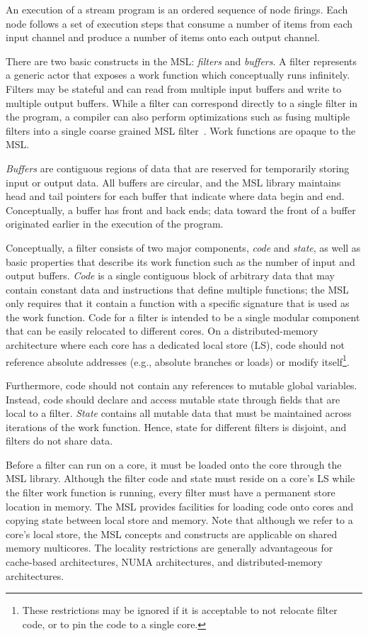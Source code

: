 An execution of a stream program is an ordered sequence of node
firings. Each node follows a set of execution steps that consume a
number of items from each input channel and produce a number of items
onto each output channel.

There are two basic constructs in the MSL: \emph{filters} and
\emph{buffers}. A filter represents a generic actor that exposes a
work function which conceptually runs infinitely. Filters may be
stateful and can read from multiple input buffers and write to multiple
output buffers. While a filter can correspond directly to a
single filter in the program, a compiler can also perform
optimizations such as fusing multiple filters into a single
coarse grained MSL filter~\cite{asplos02}. Work functions are opaque to the MSL.

\emph{Buffers} are contiguous regions of data that are reserved for
temporarily storing input or output data. All buffers are circular,
and the MSL library maintains head and tail pointers for each buffer
that indicate where data begin and end. Conceptually, a buffer has
front and back ends; data toward the front of a buffer originated
earlier in the execution of the program.

Conceptually, a filter consists of two major components, \emph{code}
and \emph{state}, as well as basic properties that describe its work
function such as the number of input and output buffers. \emph{Code}
is a single contiguous block of arbitrary data that may contain
constant data and instructions that define multiple functions; the MSL
only requires that it contain a function with a specific signature
that is used as the work function. Code for a filter is intended to be
a single modular component that can be easily relocated to different
cores. On a distributed-memory architecture where each core has a
dedicated local store (LS), code should not reference absolute
addresses (e.g., absolute branches or loads) or modify
itself\footnote{These restrictions may be ignored if it is acceptable
to not relocate filter code, or to pin the code to a single core.}.

Furthermore, code should not contain any references to mutable global
variables. Instead, code should declare and access mutable state
through fields that are local to a filter. \emph{State} contains all
mutable data that must be maintained across iterations of the work
function. Hence, state for different filters is disjoint, and filters
do not share data.

Before a filter can run on a core, it must be loaded onto the core
through the MSL library. Although the filter code and state must
reside on a core's LS while the filter work function is running, every
filter must have a permanent store location in memory. The MSL
provides facilities for loading code onto cores and copying state
between local store and memory. Note that although we refer to a
core's local store, the MSL concepts and constructs are applicable on
shared memory multicores. The locality restrictions are generally
advantageous for cache-based architectures, NUMA architectures, and
distributed-memory architectures.

